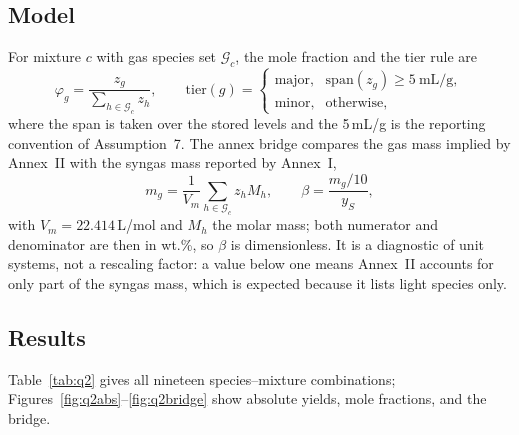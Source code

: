 \documentclass[withoutpreface,bwprint]{apmcmthesis}
\begin{document}
\subsection{Model}
For mixture $c$ with gas species set $\mathcal{G}_c$, the mole fraction and the tier rule are
\begin{equation}
\varphi_g=\frac{z_g}{\sum_{h\in\mathcal{G}_c}z_h},\qquad
\text{tier}(g)=\begin{cases}\text{major}, & \mathrm{span}(z_g)\ge 5\ \mathrm{mL/g},\\ \text{minor}, & \text{otherwise},\end{cases}
\label{eq:phi}
\end{equation}
where the span is taken over the stored levels and the 5\,mL/g is the reporting convention of Assumption~7. The annex bridge compares the gas mass implied by Annex~II with the syngas mass reported by Annex~I,
\begin{equation}
m_g=\frac{1}{V_m}\sum_{h\in\mathcal{G}_c}z_hM_h,\qquad
\beta=\frac{m_g/10}{y_{S}},
\label{eq:beta}
\end{equation}
with $V_m=22.414$\,L/mol and $M_h$ the molar mass; both numerator and denominator are then in wt.\%, so $\beta$ is dimensionless. It is a diagnostic of unit systems, not a rescaling factor: a value below one means Annex~II accounts for only part of the syngas mass, which is expected because it lists light species only.

\subsection{Results}
Table~\ref{tab:q2} gives all nineteen species--mixture combinations; Figures~\ref{fig:q2abs}--\ref{fig:q2bridge} show absolute yields, mole fractions, and the bridge.
\end{document}
